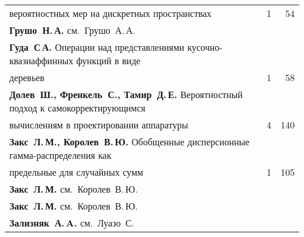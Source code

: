 {\begin{tabular}{p{388pt}rr}
\hspace*{23pt}вероятностных мер на дискретных пространствах\dotfill&1&54\\
\textbf{Грушо~Н.\,А.} см.~Грушо~А.\,А.&&\\
\textbf{Гуда~С\,А.}
Операции над представлениями кусочно-квазиаффинных функций в виде\linebreak
\vspace*{-12pt}\\
\hspace*{23pt}деревьев\dotfill&1&58\\
\textbf{Долев~Ш., Френкель~С., Тамир~Д.\,Е.}
Вероятностный подход к самокорректирующимся\linebreak
\vspace*{-12pt}\\
\hspace*{23pt}вычислениям в проектировании аппаратуры\dotfill&4&140\\
\textbf{Закс~Л.\,М., Королев~В.\,Ю.}
Обобщенные дисперсионные гамма-распределения как\linebreak
\vspace*{-12pt}\\
\hspace*{23pt}предельные для случайных сумм\dotfill&1&105\\
\textbf{Закс~Л.\,М.} см.~Королев~В.\,Ю.&&\\
\textbf{Закс~Л.\,М.} см.~Королев~В.\,Ю.&&\\
\textbf{Зализняк~А.\,A.} см.~Луазо~С.&&\\
\end{tabular}
}

\pagebreak

\def\leftkol{АВТОРСКИЙ УКАЗАТЕЛЬ ЗА 2013 г.} %

\def\rightkol{АВТОРСКИЙ УКАЗАТЕЛЬ ЗА 2013 г.} %

